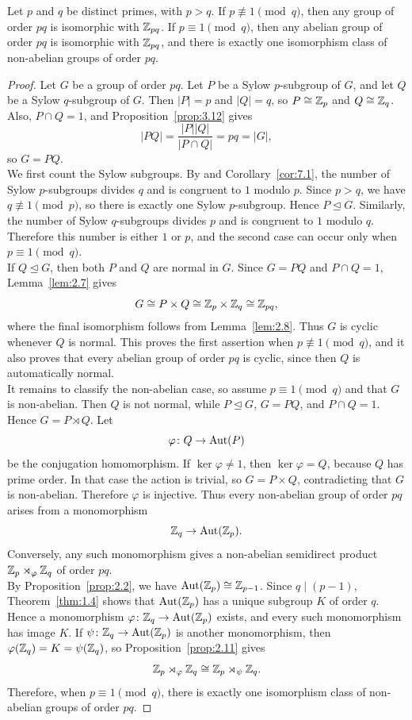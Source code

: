 \documentclass[../Odyssey_Project.tex]{subfiles}
\begin{document}
\begin{proposition}
\label{prop:7.3}
Let $p$ and $q$ be distinct primes, with $p > q$. If $p \not\equiv 1 \pmod{q}$, then any group of order $pq$ is isomorphic with $\mathbb{Z}_{pq}$. If $p \equiv 1 \pmod{q}$, then any abelian group of order $pq$ is isomorphic with $\mathbb{Z}_{pq}$, and there is exactly one isomorphism class of non-abelian groups of order $pq$.
\end{proposition}
\begin{proof}
Let $G$ be a group of order $pq$. Let $P$ be a Sylow $p$-subgroup of $G$, and let $Q$ be a Sylow $q$-subgroup of $G$. Then $|P|=p$ and $|Q|=q$, so $P\cong \mathbb{Z}_p$ and $Q\cong \mathbb{Z}_q$. Also, $P\cap Q=1$, and Proposition~\ref{prop:3.12} gives
\[
    |PQ|=\frac{|P||Q|}{|P\cap Q|}=pq=|G|,
\]
so $G=PQ$.\\
We first count the Sylow subgroups. By  and Corollary~\ref{cor:7.1}, the number of Sylow $p$-subgroups divides $q$ and is congruent to $1$ modulo $p$. Since $p>q$, we have $q\not\equiv 1\pmod{p}$, so there is exactly one Sylow $p$-subgroup. Hence $P\trianglelefteq G$. Similarly, the number of Sylow $q$-subgroups divides $p$ and is congruent to $1$ modulo $q$. Therefore this number is either $1$ or $p$, and the second case can occur only when $p\equiv 1\pmod{q}$.\\
If $Q\trianglelefteq G$, then both $P$ and $Q$ are normal in $G$. Since $G=PQ$ and $P\cap Q=1$, Lemma~\ref{lem:2.7} gives
\[
    G\cong P\times Q\cong \mathbb{Z}_p\times \mathbb{Z}_q\cong \mathbb{Z}_{pq},
\]
where the final isomorphism follows from Lemma~\ref{lem:2.8}. Thus $G$ is cyclic whenever $Q$ is normal. This proves the first assertion when $p\not\equiv 1\pmod{q}$, and it also proves that every abelian group of order $pq$ is cyclic, since then $Q$ is automatically normal.\\
It remains to classify the non-abelian case, so assume $p\equiv 1\pmod{q}$ and that $G$ is non-abelian. Then $Q$ is not normal, while $P\trianglelefteq G$, $G=PQ$, and $P\cap Q=1$. Hence $G=P\rtimes Q$. Let
\[
    \varphi\colon Q\to \operatorname{Aut}(P)
\]
be the conjugation homomorphism. If $\ker\varphi\neq 1$, then $\ker\varphi=Q$, because $Q$ has prime order. In that case the action is trivial, so $G=P\times Q$, contradicting that $G$ is non-abelian. Therefore $\varphi$ is injective. Thus every non-abelian group of order $pq$ arises from a monomorphism
\[
    \mathbb{Z}_q\to \operatorname{Aut}(\mathbb{Z}_p).
\]
Conversely, any such monomorphism gives a non-abelian semidirect product $\mathbb{Z}_p\rtimes_{\varphi}\mathbb{Z}_q$ of order $pq$.\\
By Proposition~\ref{prop:2.2}, we have $\operatorname{Aut}(\mathbb{Z}_p)\cong \mathbb{Z}_{p-1}$. Since $q\mid (p-1)$, Theorem~\ref{thm:1.4} shows that $\operatorname{Aut}(\mathbb{Z}_p)$ has a unique subgroup $K$ of order $q$. Hence a monomorphism $\varphi\colon \mathbb{Z}_q\to \operatorname{Aut}(\mathbb{Z}_p)$ exists, and every such monomorphism has image $K$. If $\psi\colon \mathbb{Z}_q\to \operatorname{Aut}(\mathbb{Z}_p)$ is another monomorphism, then $\varphi(\mathbb{Z}_q)=K=\psi(\mathbb{Z}_q)$, so Proposition~\ref{prop:2.11} gives
\[
    \mathbb{Z}_p\rtimes_{\varphi}\mathbb{Z}_q\cong \mathbb{Z}_p\rtimes_{\psi}\mathbb{Z}_q.
\]
Therefore, when $p\equiv 1\pmod{q}$, there is exactly one isomorphism class of non-abelian groups of order $pq$.
\end{proof}
\end{document}
